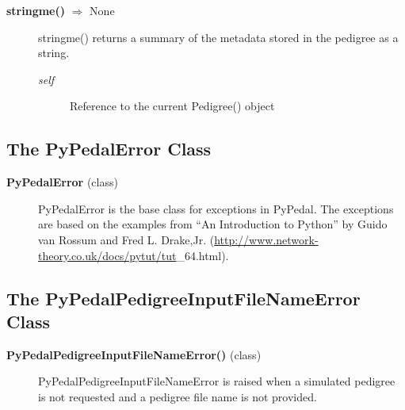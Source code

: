 \begin{description}
\item[\textbf{stringme()} $\Rightarrow$ None]
stringme() returns a summary of the metadata stored in the pedigree as a string.
\begin{description}
\item[\emph{self}] Reference to the current Pedigree() object
\end{description}

\end{description}

\subsection*{The PyPedalError Class}
\begin{description}
\item[\textbf{PyPedalError} (class)]
PyPedalError is the base class for exceptions in PyPedal. The exceptions are based on the examples from ``An Introduction to Python'' by Guido van Rossum and Fred L. Drake,Jr. (\url{http://www.network-theory.co.uk/docs/pytut/tut}\_64.html).
\end{description}

\subsection*{The PyPedalPedigreeInputFileNameError Class}
\begin{description}
\item[\textbf{PyPedalPedigreeInputFileNameError()} (class)]
PyPedalPedigreeInputFileNameError is raised when a simulated pedigree is not requested and a pedigree file name is not provided.
\end{description}

